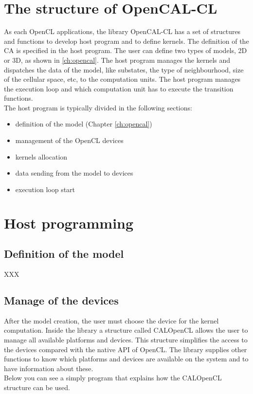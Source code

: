 \section{The structure of OpenCAL-CL}
As each OpenCL applications, the library OpenCAL-CL has a set of
structures and functions to develop host program and to define
kernels. The definition of the CA is specified in the host
program. The user can define two types of models, 2D or 3D, as shown
in \ref{ch:opencal}.  The host program manages the kernels and
dispatches the data of the model, like substates, the type of
neighbourhood, size of the cellular space, etc, to the computation
units.  The host program manages the execution loop and which
computation unit has to execute the transition functions. \\ The host
program is typically divided in the following sections:
\begin{itemize}
\item definition of the model (Chapter \ref{ch:opencal})
\item management of the OpenCL devices
\item kernels allocation
\item data sending from the model to devices
\item execution loop start
\end{itemize}

\section{Host programming} 

\subsection{Definition of the model}

XXX

\subsection{Manage of the devices}

After the model creation, the user must choose the device for the
kernel computation.  Inside the library a structure called CALOpenCL
allows the user to manage all available platforms and devices.  This
structure simplifies the access to the devices compared with the
native API of OpenCL. The library supplies other functions to know
which platforms and devices are available on the system and to have
information about these.\\ Below you can see a simply program that
explains how the CALOpenCL structure can be used.


